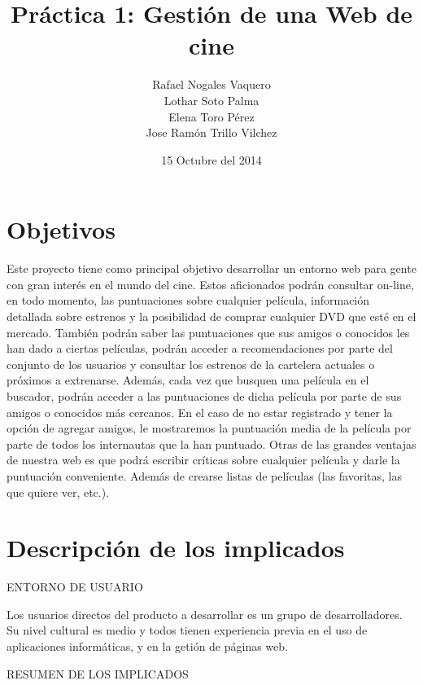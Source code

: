 \documentclass{article}
\title{Práctica 1: Gestión de una Web de cine}
\author{Rafael Nogales Vaquero
\\Lothar Soto Palma
\\Elena Toro Pérez
\\Jose Ramón Trillo Vilchez}
\date{15 Octubre del 2014}
\begin{document}
\maketitle

\section{Objetivos}
Este proyecto tiene como principal objetivo desarrollar un entorno web para gente con gran interés en el mundo del cine.
Estos aficionados podrán consultar on-line, en todo momento, las puntuaciones sobre cualquier película, información
detallada sobre estrenos y la posibilidad de comprar cualquier DVD que esté en el mercado.
También podrán saber las puntuaciones que sus amigos o conocidos les han dado a ciertas películas, podrán acceder a
recomendaciones por parte del conjunto de los usuarios y consultar los estrenos de la cartelera actuales o próximos a
extrenarse.
Además, cada vez que busquen una película en el buscador, podrán acceder a las puntuaciones de dicha película por parte de
sus amigos o conocidos más cercanos.
En el caso de no estar registrado y tener la opción de agregar amigos, le mostraremos la puntuación media de la película
por parte de todos los internautas que la han puntuado.
Otras de las grandes ventajas de nuestra web es que podrá escribir críticas sobre cualquier película y darle la puntuación
conveniente. Además de crearse listas de películas (las favoritas, las que quiere ver, etc.).
\section{Descripción de los implicados}
ENTORNO DE USUARIO
\begin{description}
\item Los usuarios directos del producto a desarrollar es un grupo de desarrolladores. Su nivel cultural es medio y todos tienen experiencia previa en el uso de aplicaciones informáticas, y en la getión de páginas web.
\end{description}
\vspace{3cm}
RESUMEN DE LOS IMPLICADOS
\end{document}
